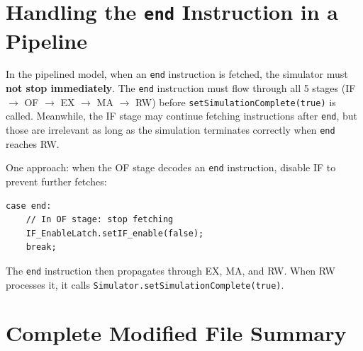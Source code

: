 \documentclass[12pt,a4paper]{article}
\begin{document}
\section{Handling the \texttt{end} Instruction in a Pipeline}

\begin{warningbox}
In the pipelined model, when an \texttt{end} instruction is fetched, the simulator must \textbf{not stop immediately}. The \texttt{end} instruction must flow through all 5 stages (IF $\rightarrow$ OF $\rightarrow$ EX $\rightarrow$ MA $\rightarrow$ RW) before \texttt{setSimulationComplete(true)} is called. Meanwhile, the IF stage may continue fetching instructions after \texttt{end}, but those are irrelevant as long as the simulation terminates correctly when \texttt{end} reaches RW.
\end{warningbox}

One approach: when the OF stage decodes an \texttt{end} instruction, disable IF to prevent further fetches:

\begin{lstlisting}[style=javastyle]
case end:
    // In OF stage: stop fetching
    IF_EnableLatch.setIF_enable(false);
    break;
\end{lstlisting}

The \texttt{end} instruction then propagates through EX, MA, and RW. When RW processes it, it calls \texttt{Simulator.setSimulationComplete(true)}.

\section{Complete Modified File Summary}
\end{document}
